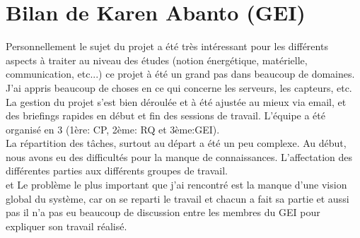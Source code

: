 \documentclass [a4paper] {report}
\begin{document}
\section*{Bilan de Karen Abanto (GEI)}


Personnellement le sujet du projet a été très intéressant pour les différents
aspects à traiter au niveau des études (notion énergétique, matérielle, communication, etc...)
ce projet à été un grand pas dans beaucoup de domaines. 
J'ai appris beaucoup de choses en ce qui concerne les serveurs, les capteurs, etc.\\

La gestion du projet s'est bien déroulée et à été ajustée au mieux
via email, et des briefings rapides en début et fin des sessions de travail.
L'équipe a été organisé en 3 (1ère: CP, 2ème: RQ et 3ème:GEI).\\

La répartition des tâches, surtout au départ a été un peu complexe. Au début, nous avons eu des difficultés pour la manque de connaissances. L'affectation des différentes parties aux différents groupes de travail.\\
et Le problème le plus important que j'ai rencontré est la manque d'une 
vision global du système, car on se reparti le travail et chacun a fait sa partie 
et aussi pas il n'a pas eu beaucoup de discussion entre les membres du GEI pour expliquer son travail réalisé.
\end{document}
